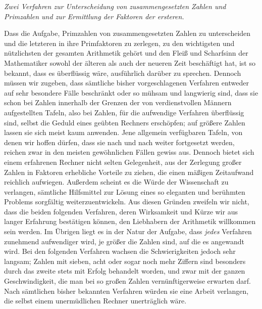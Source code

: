 \begin{center}\textit{Zwei Verfahren zur Unterscheidung von zusammengesetzten Zahlen und Primzahlen und zur Ermittlung der Faktoren der ersteren.}\end{center}


Dass die Aufgabe, Primzahlen von zusammengesetzten Zahlen zu unterscheiden und die letzteren in ihre Primfaktoren zu zerlegen, zu den wichtigsten und nützlichsten der gesamten Arithmetik gehört und den Fleiß und Scharfsinn der Mathematiker sowohl der älteren als auch der neueren Zeit beschäftigt hat, ist so bekannt, dass es überflüssig wäre, ausführlich darüber zu sprechen. Dennoch müssen wir zugeben, dass sämtliche bisher vorgeschlagenen Verfahren entweder auf sehr besondere Fälle beschränkt oder so mühsam und langwierig sind, dass sie schon bei Zahlen innerhalb der Grenzen der von verdienstvollen Männern aufgestellten Tafeln, also bei Zahlen, für die aufwendige Verfahren überflüssig sind, selbst die Geduld eines geübten Rechners erschöpfen; auf größere Zahlen lassen sie sich meist kaum anwenden. Jene allgemein verfügbaren Tafeln, von denen wir hoffen dürfen, dass sie nach und nach weiter fortgesetzt werden, reichen zwar in den meisten gewöhnlichen Fällen gewiss aus. Dennoch bietet sich einem erfahrenen Rechner nicht selten Gelegenheit, aus der Zerlegung großer Zahlen in Faktoren erhebliche Vorteile zu ziehen, die einen mäßigen Zeitaufwand reichlich aufwiegen. Außerdem scheint es die Würde der Wissenschaft zu verlangen, sämtliche Hilfsmittel zur Lösung eines so eleganten und berühmten Problems sorgfältig weiterzuentwickeln. Aus diesen Gründen
zweifeln wir nicht, dass die beiden folgenden Verfahren, deren Wirksamkeit und Kürze wir aus langer Erfahrung bestätigen können, den Liebhabern der Arithmetik willkommen sein werden. Im Übrigen liegt es in der Natur der Aufgabe, dass \textit{jedes} Verfahren zunehmend aufwendiger wird, je größer die Zahlen sind, auf die es angewandt wird. Bei den folgenden Verfahren wachsen die Schwierigkeiten jedoch sehr langsam; Zahlen mit sieben, acht oder sogar noch mehr Ziffern sind besonders durch das zweite stets mit Erfolg behandelt worden, und zwar mit der ganzen Geschwindigkeit, die man bei so großen Zahlen vernünftigerweise erwarten darf. Nach sämtlichen bisher bekannten Verfahren würden sie eine Arbeit verlangen, die selbst einem unermüdlichen Rechner unerträglich wäre.

